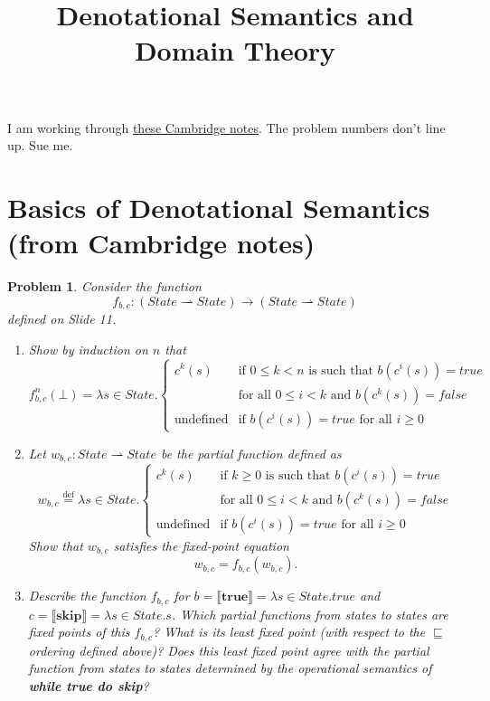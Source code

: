 \documentclass{article}
\title{Denotational Semantics and Domain Theory}
\author{}
\date{}
\newtheorem{problem}{Problem}[section]}
\newcommand{\pf}{\rightharpoonup}
\newcommand{\f}{\rightarrow}
\begin{document}
\maketitle

\noindent
I am working through
\href{https://www.cl.cam.ac.uk/teaching/1112/DenotSem/dens-notes-bw.pdf}{these
Cambridge notes}. The problem numbers don't line up. Sue me.

\section{Basics of Denotational Semantics (from Cambridge notes)}
\begin{problem}
    Consider the function
    \[
        f_{b,c} : (State \pf State) \f (State \pf State)
    \]
    defined on Slide 11.
    \begin{enumerate}[label=\alph*)]
        \item Show by induction on $n$ that
            \[
                f_{b,c}^n(\bot)=\lambda s\in State.\begin{cases}
                    c^k(s) & \text{if $0\leq k <n$ is such that $b(c^i(s))=true$} \\
                    & \text{for all $0\leq i<k$ and $b(c^k(s))=false$} \\[2ex]
                    \text{undefined} & \text{if $b(c^i(s))=true$ for all $i\geq 0$}
                \end{cases}
            \]
        \item Let $w_{b,c}:State \pf State$ be the partial function defined
            as
            \[
                w_{b,c}\stackrel{\text{def}}{=} \lambda s\in
                State.\begin{cases}
                    c^k(s) & \text{if $k\geq 0$ is such that $b(c^i(s))=true$} \\
                    & \text{for all $0\leq i<k$ and $b(c^k(s))=false$} \\[2ex]
                    \text{undefined} & \text{if $b(c^i(s))=true$ for all $i\geq 0$}
                \end{cases}
            \]
            Show that $w_{b,c}$ satisfies the fixed-point equation
            \[
                w_{b,c}=f_{b,c}(w_{b,c}).
            \]
        \item Describe the function $f_{b,c}$ for
            $b=\llbracket\textbf{true}\rrbracket=\lambda s\in State.true$ and
            $c=\llbracket \textbf{skip}\rrbracket=\lambda s\in State.s$. Which
            partial functions from states to states are fixed points of this
            $f_{b,c}$? What is its least fixed point (with respect to the
            $\sqsubseteq$ ordering defined above)? Does this least fixed point
            agree with the partial function from states to states determined by
            the operational semantics of \textbf{while true do skip}?
    \end{enumerate}
\end{problem}
\end{document}
